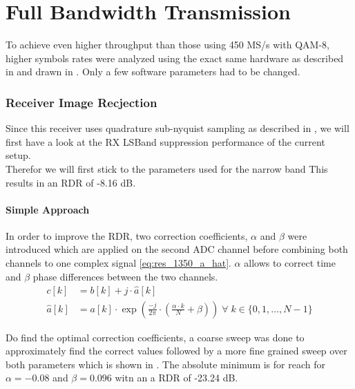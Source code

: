 \chapter{Full Bandwidth Transmission}
\label{chap:res_1350}

To achieve even higher throughput than those using 450 MS/s with \gls{QAM}-8,
higher symbols rates were analyzed using the exact same hardware as described
in  and drawn in . Only a
few software parameters had to be changed. \\

\subsection{Receiver Image Recjection}
Since this receiver uses quadrature sub-nyquist sampling as described in
, we will first have a look at the \gls{RX} \gls{LSBand}
suppression performance of the current setup. \\

Therefor we will first stick to the parameters used for the narrow band
This results in an \gls{RDR} of -8.16 dB. \\

\subsubsection{Simple Approach}
In order to improve the \gls{RDR}, two correction coefficients, $\alpha$ and
$\beta$ were introduced which are applied on the second \gls{ADC} channel
before combining both channels to one complex signal \eqref{eq:res_1350_a_hat}.
$\alpha$ allows to correct time and $\beta$ phase differences between
the two channels. \\

\begin{align}
  c[k] &= b[k] + j \cdot \hat a[k] \\
  \hat a[k] &= a[k]  \cdot \exp\left(
  \frac{-j}{2 \pi} \cdot \left(\frac{\alpha \cdot k}{N} + \beta\right)
  \right) \;\forall\; k \in \{0, 1, \dots,  N-1\}
  \label{eq:res_1350_a_hat}
\end{align}

Do find the optimal correction coefficients, a coarse sweep was done to approximately
find the correct values followed by a more fine grained sweep over both parameters
which is shown in .
The absolute minimum is for reach for $\alpha = -0.08$ and $\beta = 0.096$ witn an
a \gls{RDR} of -23.24 dB. \\

